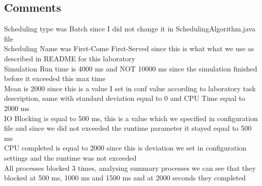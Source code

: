 \subsection{Comments}
Scheduling type was Batch since I did not change it in SchedulingAlgorithm.java
file \\
Scheduling Name was First-Come First-Served since this is what what we use as
described in README for this laboratory \\
Simulation Run time is 4000 ms and NOT 10000 ms since the simulation finished
before it exceeded this max time \\
Mean is 2000 since this is a value I set in conf value according to laboratory
task description, same with standard deviation equal to 0 and CPU Time equal to
2000 ms \\
IO Blocking is equal to 500 ms, this is a value which we specified in
configuration file and since we did not exceeded the runtime parameter it stayed
equal to 500 ms \\
CPU completed is equal to 2000 since this is deviation we set in configuration
settings and the runtime was not exceeded \\
All processes blocked 3 times, analysing summary processes we can see that they
blocked at 500 ms, 1000 ms and 1500 ms and at 2000 seconds they completed 
 
